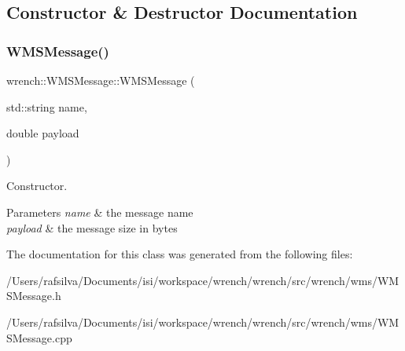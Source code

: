 \subsection{Constructor \& Destructor Documentation}
\mbox{\label{classwrench_1_1_w_m_s_message_a8f1c6f474a31ab8cb53b579bd48eed27}} 
\subsubsection{\texorpdfstring{W\+M\+S\+Message()}{WMSMessage()}}
{\footnotesize\ttfamily wrench\+::\+W\+M\+S\+Message\+::\+W\+M\+S\+Message (\begin{DoxyParamCaption}\item[{std\+::string}]{name,  }\item[{double}]{payload }\end{DoxyParamCaption})\hspace{0.3cm}{\ttfamily [protected]}}



Constructor. 


\begin{DoxyParams}{Parameters}
{\em name} & the message name \\
\hline
{\em payload} & the message size in bytes \\
\hline
\end{DoxyParams}


The documentation for this class was generated from the following files\+:\begin{DoxyCompactItemize}
\item 
/\+Users/rafsilva/\+Documents/isi/workspace/wrench/wrench/src/wrench/wms/W\+M\+S\+Message.\+h\item 
/\+Users/rafsilva/\+Documents/isi/workspace/wrench/wrench/src/wrench/wms/W\+M\+S\+Message.\+cpp\end{DoxyCompactItemize}

